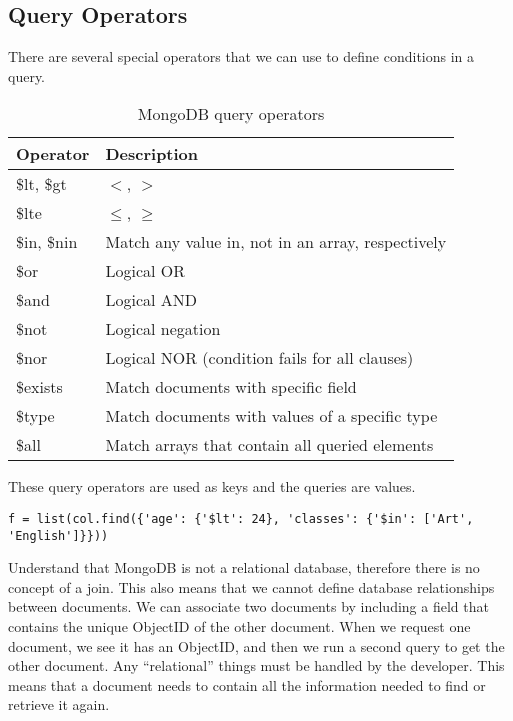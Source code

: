 \subsection*{Query Operators}
There are several special operators that we can use to define conditions in a query.
\begin{table}
\begin{tabular}{|l|l|}
\hline
Operator & Description \\
\hline
\$lt, \$gt & $<$, $>$ \\
\$lte & $\leq$, $\geq$ \\
\$in, \$nin & Match any value in, not in an array, respectively \\
\hline
\$or & Logical OR \\
\$and & Logical AND \\
\$not & Logical negation \\
\$nor & Logical NOR (condition fails for all clauses) \\
\hline
\$exists & Match documents with specific field \\
\$type & Match documents with values of a specific type \\
\hline
\$all & Match arrays that contain all queried elements \\
\end{tabular}
\caption{MongoDB query operators}
\label{table:queryoperators}
\end{table}
These query operators are used as keys and the queries are values.
\begin{lstlisting}
f = list(col.find({'age': {'$lt': 24}, 'classes': {'$in': ['Art', 'English']}}))
\end{lstlisting}

Understand that MongoDB is not a relational database, therefore there is no concept of a join.
This also means that we cannot define database relationships between documents.
We can associate two documents by including a field that contains the unique ObjectID of the other document.
When we request one document, we see it has an ObjectID, and then we run a second query to get the other document.
Any ``relational'' things must be handled by the developer.
This means that a document needs to contain all the information needed to find or retrieve it again.



\begin{problem}

\end{problem}

